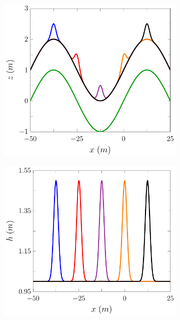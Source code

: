\begin{figure}
	\centering
	\begin{subfigure}{0.5\textwidth}
		\includegraphics[width=\textwidth]{./chp5/figures/Forced/Wet/FEVMw.pdf}
		\vspace{0.5cm}
	\end{subfigure}%
	\begin{subfigure}{0.5\textwidth}
		\includegraphics[width=\textwidth]{./chp5/figures/Forced/Wet/FEVMh.pdf}

\end{subfigure}
\end{figure}
